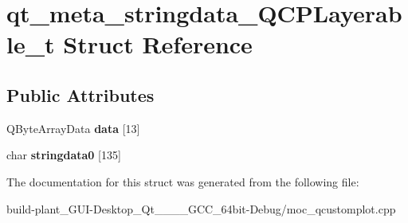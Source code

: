 \hypertarget{structqt__meta__stringdata__QCPLayerable__t}{}\section{qt\+\_\+meta\+\_\+stringdata\+\_\+\+Q\+C\+P\+Layerable\+\_\+t Struct Reference}
\label{structqt__meta__stringdata__QCPLayerable__t}
\subsection*{Public Attributes}
\begin{DoxyCompactItemize}
\item 
\mbox{\label{structqt__meta__stringdata__QCPLayerable__t_adaa7771b25eb1d5dc6cb97526d7a4995}} 
Q\+Byte\+Array\+Data {\bfseries data} \mbox{[}13\mbox{]}
\item 
\mbox{\label{structqt__meta__stringdata__QCPLayerable__t_a63a3660ec480a3586f023e4d498cee3d}} 
char {\bfseries stringdata0} \mbox{[}135\mbox{]}
\end{DoxyCompactItemize}


The documentation for this struct was generated from the following file\+:\begin{DoxyCompactItemize}
\item 
build-\/plant\+\_\+\+G\+U\+I-\/\+Desktop\+\_\+\+Qt\+\_\+\_\+\_\+\_\+\+G\+C\+C\+\_\+64bit-\/\+Debug/moc\+\_\+qcustomplot.\+cpp\end{DoxyCompactItemize}
